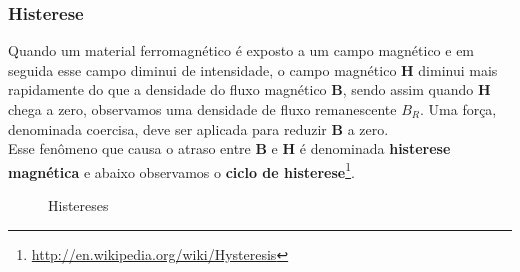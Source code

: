 \documentclass[12pt,letterpaper]{article}
\begin{document}
\subsubsection{Histerese}
Quando um material ferromagnético é exposto a um campo magnético e em seguida esse campo diminui de intensidade, o campo magnético \textbf{H} diminui mais rapidamente do que a densidade do fluxo magnético \textbf{B}, sendo assim quando \textbf{H} chega a zero, observamos uma densidade de fluxo remanescente \textbf{$B_{R}$}. Uma força, denominada coercisa, deve ser aplicada para reduzir \textbf{B} a zero.\\
Esse fenômeno que causa o atraso entre \textbf{B} e \textbf{H} é denominada \textbf{histerese magnética} e abaixo observamos o \textbf{ciclo de histerese}\footnote{\url{http://en.wikipedia.org/wiki/Hysteresis}}.
\begin{figure}[!htb]
  \centering
  \caption{Histereses}
\end{figure}
\end{document}
